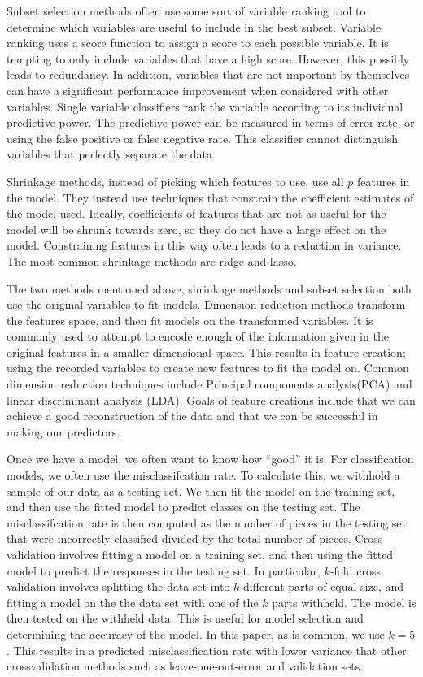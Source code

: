 \documentclass[12pt,twoside]{reedthesis}
\theoremstyle{definition}
\theoremstyle{definition}
\theoremstyle{definition}
\theoremstyle{remark}
\begin{document}
Subset selection methods often use some sort of variable ranking tool to
determine which variables are useful to include in the best subset.
Variable ranking uses a score function to assign a score to each
possible variable. It is tempting to only include variables that have a
high score. However, this possibly leads to redundancy. In addition,
variables that are not important by themselves can have a significant
performance improvement when considered with other variables. Single
variable classifiers rank the variable according to its individual
predictive power. The predictive power can be measured in terms of error
rate, or using the false positive or false negative rate. This
classifier cannot distinguish variables that perfectly separate the
data.

Shrinkage methods, instead of picking which features to use, use all
\(p\) features in the model. They instead use techniques that constrain
the coefficient estimates of the model used. Ideally, coefficients of
features that are not as useful for the model will be shrunk towards
zero, so they do not have a large effect on the model. Constraining
features in this way often leads to a reduction in variance. The most
common shrinkage methods are ridge and lasso.

The two methods mentioned above, shrinkage methods and subset selection
both use the original variables to fit models. Dimension reduction
methods transform the features space, and then fit models on the
transformed variables. It is commonly used to attempt to encode enough
of the information given in the original features in a smaller
dimensional space. This results in feature creation; using the recorded
variables to create new features to fit the model on. Common dimension
reduction techniques include Principal components analysis(PCA) and
linear discriminant analysis (LDA). Goals of feature creations include
that we can achieve a good reconstruction of the data and that we can be
successful in making our predictors.

Once we have a model, we often want to know how ``good'' it is. For
classification models, we often use the misclassifcation rate. To
calculate this, we withhold a sample of our data as a testing set. We
then fit the model on the training set, and then use the fitted model to
predict classes on the testing set. The misclassifcation rate is then
computed as the number of pieces in the testing set that were
incorrectly classified divided by the total number of pieces. Cross
validation involves fitting a model on a training set, and then using
the fitted model to predict the responses in the testing set. In
particular, \(k\)-fold cross validation involves splitting the data set
into \(k\) different parts of equal size, and fitting a model on the the
data set with one of the \(k\) parts withheld. The model is then tested
on the withheld data. This is useful for model selection and determining
the accuracy of the model. In this paper, as is common, we use
\(k = 5\). This results in a predicted misclassification rate with lower
variance that other crossvalidation methods such as leave-one-out-error
and validation sets.
\end{document}
